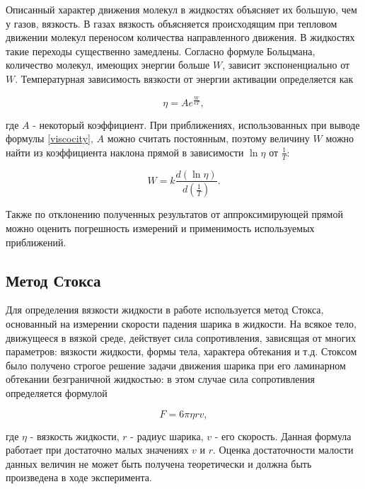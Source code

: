 \documentclass[a4paper,12pt]{article} %
\begin{document}
Описанный характер движения молекул в жидкостях объясняет их большую, чем у газов, вязкость. В газах вязкость объясняется происходящим при тепловом движении молекул переносом количества направленного движения. В жидкостях такие переходы существенно замедлены. Согласно формуле Больцмана, количество молекул, имеющих энергии больше $W$, зависит экспоненциально от $W$. Температурная зависимость вязкости от энергии активации определяется как

\begin{equation}
    \eta = Ae^{\frac{W}{kT}},
    \label{viscocity}
\end{equation}

где $A$ - некоторый коэффициент. При приближениях, использованных при выводе формулы \eqref{viscocity}, $A$ можно считать постоянным, поэтому величину $W$ можно найти из коэффициента наклона прямой в зависимости $\ln{\eta}$ от $\frac{1}{T}$:

\begin{equation}
    W = k\frac{d(\ln{\eta})}{d(\frac{1}{T})}.
    \label{activationEnergy}
\end{equation}

Также по отклонению полученных результатов от аппроксимирующей прямой можно оценить погрешность измерений и применимость используемых приближений.

\subsection{Метод Стокса}

Для определения вязкости жидкости в работе используется метод Стокса, основанный на измерении скорости падения шарика в жидкости. На всякое тело, движущееся в вязкой среде, действует сила сопротивления, зависящая от многих параметров: вязкости жидкости, формы тела, характера обтекания и т.д. Стоксом было получено строгое решение задачи движения шарика при его ламинарном обтекании безграничной жидкостью: в этом случае сила сопротивления определяется формулой

\begin{equation}
    F = 6\pi\eta r v,
    \label{Stokes}
\end{equation}

где $\eta$ - вязкость жидкости, $r$ - радиус шарика, $v$ - его скорость. Данная формула работает при достаточно малых значениях $v$ и $r$. Оценка достаточности малости данных величин не может быть получена теоретически и должна быть произведена в ходе эксперимента.
\end{document}
